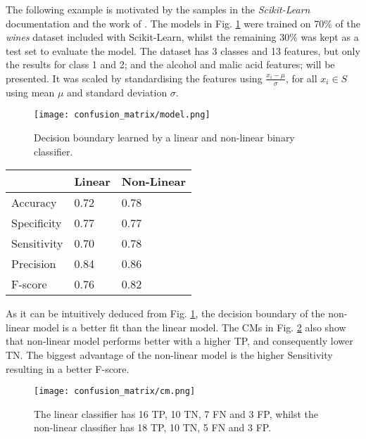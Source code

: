 The following example is motivated by the samples in the \textit{Scikit-Learn} documentation and the work of  \citep{geron2017hands}. The models in Fig. \ref{fig:cm_model} were trained on 70\% of the \textit{wines} dataset included with Scikit-Learn, whilst the remaining 30\% was kept as a test set to evaluate the model. The dataset has 3 classes and 13 features, but only the results for class 1 and 2; and the alcohol and malic acid features; will be presented. It was scaled by standardising the features using $\frac{x_i - \mu}{\sigma}$, for all $x_i \in S$ using mean $\mu$ and standard deviation $\sigma$.

\begin{figure}
  \texttt{[image: confusion\_matrix/model.png]}
  \caption{Decision boundary learned by a linear and non-linear binary classifier.}
  \label{fig:cm_model}
\end{figure}

\begin{margintable}
  \begin{tabular}{lll}
    \toprule
                 & Linear & Non-Linear \\
    \midrule
    Accuracy     & 0.72   & 0.78 \\
    Specificity  & 0.77   & 0.77 \\
    Sensitivity  & 0.70   & 0.78 \\
    Precision    & 0.84   & 0.86 \\
    F-score      & 0.76   & 0.82 \\
    \bottomrule
  \end{tabular}
  \caption{Statistics derived from the CMs in Fig. \ref{fig:cm_wines}.}
  \label{tab:cm_metrics}
\end{margintable}

As it can be intuitively deduced from Fig. \ref{fig:cm_model}, the decision boundary of the non-linear model is a better fit than the linear model. The CMs in Fig. \ref{fig:cm_wines} also show that non-linear model performs better with a higher TP, and consequently lower TN. The biggest advantage of the non-linear model is the higher Sensitivity resulting in a better F-score.

\begin{figure}
  \texttt{[image: confusion\_matrix/cm.png]}
  \caption{The linear classifier has 16 TP, 10 TN, 7 FN and 3 FP, whilst the non-linear classifier has 18 TP, 10 TN, 5 FN and 3 FP.}
  \label{fig:cm_wines}
\end{figure}

